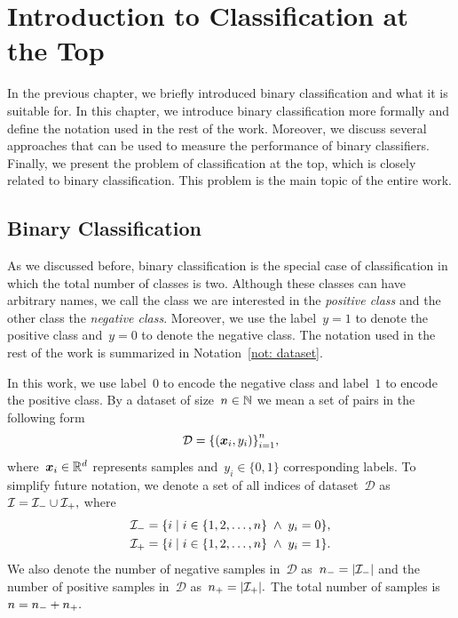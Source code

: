 \chapter{Introduction to Classification at the Top}\label{chap: binary classification}

In the previous chapter, we briefly introduced binary classification and what it is suitable for. In this chapter, we introduce binary classification more formally and define the notation used in the rest of the work. Moreover, we discuss several approaches that can be used to measure the performance of binary classifiers. Finally, we present the problem of classification at the top, which is closely related to binary classification. This problem is the main topic of the entire work.

\section{Binary Classification}

As we discussed before, binary classification is the special case of classification in which the total number of classes is two. Although these classes can have arbitrary names, we call the class we are interested in the \emph{positive class} and the other class the \emph{negative class}. Moreover, we use the label~$y=1$ to denote the positive class and~$y=0$ to denote the negative class. The notation used in the rest of the work is summarized in Notation~\ref{not: dataset}.

\begin{notation}[Dataset]\label{not: dataset}
  In this work, we use label~$0$ to encode the negative class and label~$1$ to encode the positive class. By a dataset of size~$n \in \mathbb{N}$ we mean a set of pairs in the following form
  \begin{equation*}
    \mathcal{D} = \Brac[c]{(\bm{x}_i, y_i)}_{i=1}^{n},
  \end{equation*}
  where~$\bm{x}_i \in \mathbb{R}^d$ represents samples and~$y_i \in \{0, 1\}$ corresponding labels. To simplify future notation, we denote a set of all indices of dataset~$\mathcal{D}$ as~$\mathcal{I} = \mathcal{I}_{-} \cup \mathcal{I}_{+},$ where
  \begin{equation*}
    \begin{aligned}
      \Ineg & = \Set{i}{i \in \{1, 2, \ldots, n\} \; \land \; y_i = 0}, \\
      \Ipos & = \Set{i}{i \in \{1, 2, \ldots, n\} \; \land \; y_i = 1}.
    \end{aligned}
  \end{equation*}
  We also denote the number of negative samples in~$\mathcal{D}$ as~$\nneg = \Brac[v]{\Ineg}$ and the number of positive samples in~$\mathcal{D}$ as~$\npos = \Brac[v]{\Ipos}.$ The total number of samples is~$n = n_{-} + n_{+}.$ 
\end{notation}

